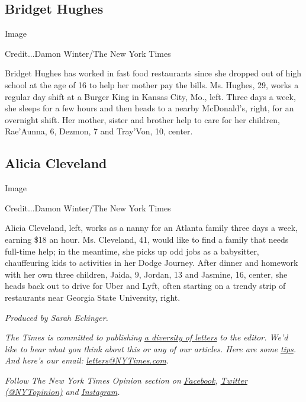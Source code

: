 \hypertarget{bridget-hughes}{%
\subsection{Bridget Hughes}\label{bridget-hughes}}

Image

Credit...Damon Winter/The New York Times

Bridget Hughes has worked in fast food restaurants since she dropped out
of high school at the age of 16 to help her mother pay the bills. Ms.
Hughes, 29, works a regular day shift at a Burger King in Kansas City,
Mo., left. Three days a week, she sleeps for a few hours and then heads
to a nearby McDonald's, right, for an overnight shift. Her mother,
sister and brother help to care for her children, Rae'Aunna, 6, Dezmon,
7 and Tray'Von, 10, center.

\hypertarget{alicia-cleveland}{%
\subsection{Alicia Cleveland}\label{alicia-cleveland}}

Image

Credit...Damon Winter/The New York Times

Alicia Cleveland, left, works as a nanny for an Atlanta family three
days a week, earning \$18 an hour. Ms. Cleveland, 41, would like to find
a family that needs full-time help; in the meantime, she picks up odd
jobs as a babysitter, chauffeuring kids to activities in her Dodge
Journey. After dinner and homework with her own three children, Jaida,
9, Jordan, 13 and Jasmine, 16, center, she heads back out to drive for
Uber and Lyft, often starting on a trendy strip of restaurants near
Georgia State University, right.

\emph{Produced by Sarah Eckinger.}

\emph{The Times is committed to publishing}
\href{https://www.nytimes3xbfgragh.onion/2019/01/31/opinion/letters/letters-to-editor-new-york-times-women.html}{\emph{a
diversity of letters}} \emph{to the editor. We'd like to hear what you
think about this or any of our articles. Here are some}
\href{https://help.nytimes3xbfgragh.onion/hc/en-us/articles/115014925288-How-to-submit-a-letter-to-the-editor}{\emph{tips}}\emph{.
And here's our email:}
\href{mailto:letters@NYTimes.com}{\emph{letters@NYTimes.com}}\emph{.}

\emph{Follow The New York Times Opinion section on}
\href{https://www.facebookcorewwwi.onion/nytopinion}{\emph{Facebook}}\emph{,}
\href{http://twitter.com/NYTOpinion}{\emph{Twitter (@NYTopinion)}}
\emph{and}
\href{https://www.instagram.com/nytopinion/}{\emph{Instagram}}\emph{.}

